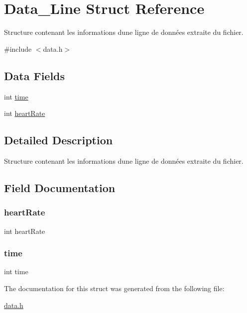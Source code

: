 \hypertarget{struct_data___line}{}\section{Data\+\_\+\+Line Struct Reference}
\label{struct_data___line}


Structure contenant les informations d\textquotesingle{}une ligne de données extraite du fichier.  




{\ttfamily \#include $<$data.\+h$>$}

\subsection*{Data Fields}
\begin{DoxyCompactItemize}
\item 
int \mbox{\hyperlink{struct_data___line_a42715f65f02da52edc5b22021d8ae670}{time}}
\item 
int \mbox{\hyperlink{struct_data___line_a2c9fb26aa9591684484d255a850ab63a}{heart\+Rate}}
\end{DoxyCompactItemize}


\subsection{Detailed Description}
Structure contenant les informations d\textquotesingle{}une ligne de données extraite du fichier. 

\subsection{Field Documentation}
\mbox{\label{struct_data___line_a2c9fb26aa9591684484d255a850ab63a}} 
\subsubsection{\texorpdfstring{heart\+Rate}{heartRate}}
{\footnotesize\ttfamily int heart\+Rate}

\mbox{\label{struct_data___line_a42715f65f02da52edc5b22021d8ae670}} 
\subsubsection{\texorpdfstring{time}{time}}
{\footnotesize\ttfamily int time}



The documentation for this struct was generated from the following file\+:\begin{DoxyCompactItemize}
\item 
\mbox{\hyperlink{data_8h}{data.\+h}}\end{DoxyCompactItemize}

